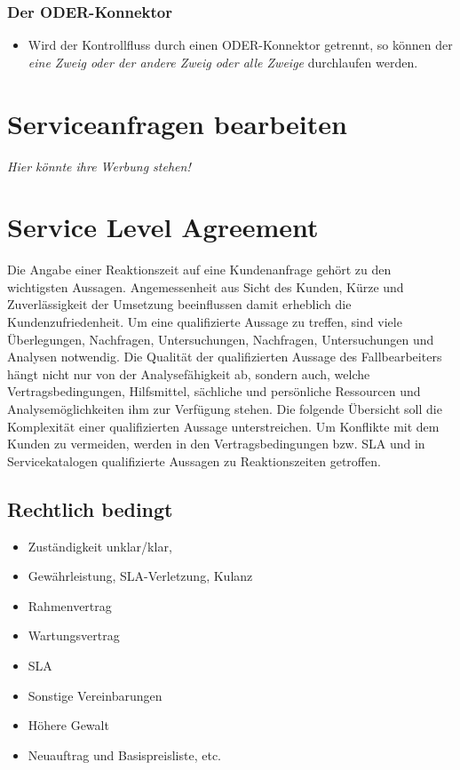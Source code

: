 \documentclass[a4paper, 12pt]{report}
\begin{document}
\begin{multicols}{2}
\subsubsection{Der ODER-Konnektor}

\begin{itemize}
	\item Wird der Kontrollfluss durch einen ODER-Konnektor getrennt, so 
		können der \emph{eine Zweig oder der andere Zweig oder alle 
		Zweige} durchlaufen werden. 
\end{itemize}

\section{Serviceanfragen bearbeiten}
\emph{Hier könnte ihre Werbung stehen!}

\section{Service Level Agreement}

Die Angabe einer Reaktionszeit auf eine Kundenanfrage gehört zu den wichtigsten 
Aussagen. Angemessenheit aus Sicht des Kunden, Kürze und Zuverlässigkeit der 
Umsetzung beeinflussen damit erheblich die Kundenzufriedenheit. Um eine 
qualifizierte Aussage zu treffen, sind viele Überlegungen, Nachfragen, 
Untersuchungen, Nachfragen, Untersuchungen und Analysen notwendig. Die Qualität 
der qualifizierten Aussage des Fallbearbeiters hängt nicht nur von der 
Analysefähigkeit ab, sondern auch, welche Vertragsbedingungen, Hilfsmittel, 
sächliche und persönliche Ressourcen und Analysemöglichkeiten ihm zur Verfügung 
stehen. Die folgende Übersicht soll die Komplexität einer qualifizierten Aussage
unterstreichen. Um Konflikte mit dem Kunden zu vermeiden, werden in den 
Vertragsbedingungen bzw. SLA und in Servicekatalogen qualifizierte Aussagen zu 
Reaktionszeiten getroffen. 

\subsection{Rechtlich bedingt}

\begin{itemize}
	\item Zuständigkeit unklar/klar, 
	\item Gewährleistung, SLA-Verletzung, Kulanz
	\item Rahmenvertrag
	\item Wartungsvertrag
	\item SLA
	\item Sonstige Vereinbarungen
	\item Höhere Gewalt
	\item Neuauftrag und Basispreisliste, etc. 
\end{itemize}


\end{multicols}
\end{document}
